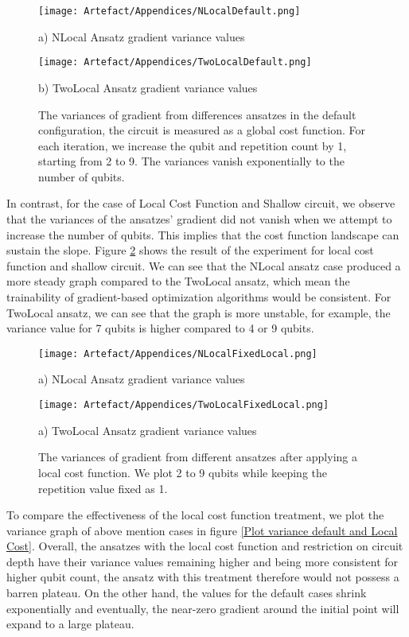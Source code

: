 \begin{figure}
    \texttt{[image: Artefact/Appendices/NLocalDefault.png]}
    \centerline{a) NLocal Ansatz gradient variance values}
    \texttt{[image: Artefact/Appendices/TwoLocalDefault.png]}
    \centerline{b) TwoLocal Ansatz gradient variance values}
    \caption{
        The variances of gradient from differences ansatzes in the default configuration, the circuit is measured as a global cost function.
        For each iteration, we increase the qubit and repetition count by 1, starting from 2 to 9.
        The variances vanish exponentially to the number of qubits.
    }
    \label{Plot ansatzes variance default}
\end{figure}

In contrast, for the case of Local Cost Function and Shallow circuit, we observe that the variances of the ansatzes' gradient did not vanish when we attempt to increase the number of qubits.
This implies that the cost function landscape can sustain the slope.
Figure \ref{Plot ansatzes variance local cost} shows the result of the experiment for local cost function and shallow circuit.
We can see that the NLocal ansatz case produced a more steady graph compared to the TwoLocal ansatz, which mean the trainability of gradient-based optimization algorithms would be consistent.
For TwoLocal ansatz, we can see that the graph is more unstable, for example, the variance value for 7 qubits is higher compared to 4 or 9 qubits.

\begin{figure}
    \texttt{[image: Artefact/Appendices/NLocalFixedLocal.png]}
    \centerline{a) NLocal Ansatz gradient variance values}
    \texttt{[image: Artefact/Appendices/TwoLocalFixedLocal.png]}
    \centerline{a) TwoLocal Ansatz gradient variance values}
    \caption{
        The variances of gradient from different ansatzes after applying a local cost function.
        We plot 2 to 9 qubits while keeping the repetition value fixed as 1. 
    }
    \label{Plot ansatzes variance local cost}
\end{figure}

To compare the effectiveness of the local cost function treatment, we plot the variance graph of above mention cases in figure \ref{Plot variance default and Local Cost}.
Overall, the ansatzes with the local cost function and restriction on circuit depth have their variance values remaining higher and being more consistent for higher qubit count, the ansatz with this treatment therefore would not possess a barren plateau.
On the other hand, the values for the default cases shrink exponentially and eventually, the near-zero gradient around the initial point will expand to a large plateau. 



